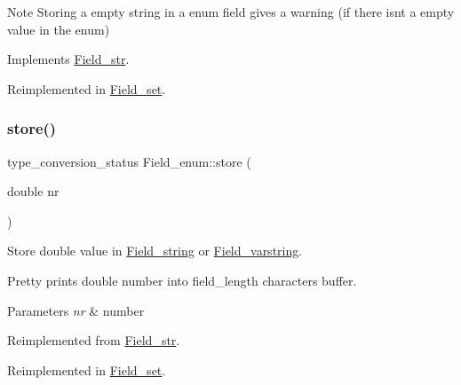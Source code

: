 \begin{DoxyNote}{Note}
Storing a empty string in a enum field gives a warning (if there isn\textquotesingle{}t a empty value in the enum) 
\end{DoxyNote}


Implements \mbox{\hyperlink{classField__str}{Field\+\_\+str}}.



Reimplemented in \mbox{\hyperlink{classField__set_a2c74d155d4d11aac75bba6b93a08cbb3}{Field\+\_\+set}}.

\mbox{\label{classField__enum_a82c1cdf5b47cd0266d9974e834695523}} 
\subsubsection{\texorpdfstring{store()}{store()}\hspace{0.1cm}{\footnotesize\ttfamily [2/2]}}
{\footnotesize\ttfamily type\+\_\+conversion\+\_\+status Field\+\_\+enum\+::store (\begin{DoxyParamCaption}\item[{double}]{nr }\end{DoxyParamCaption})\hspace{0.3cm}{\ttfamily [virtual]}}

Store double value in \mbox{\hyperlink{classField__string}{Field\+\_\+string}} or \mbox{\hyperlink{classField__varstring}{Field\+\_\+varstring}}.

Pretty prints double number into field\+\_\+length characters buffer.


\begin{DoxyParams}{Parameters}
{\em nr} & number \\
\hline
\end{DoxyParams}


Reimplemented from \mbox{\hyperlink{classField__str_ad4b48698ff57cae15a2df92f1145b102}{Field\+\_\+str}}.



Reimplemented in \mbox{\hyperlink{classField__set_a58b1852786b3bfe85a3cd2dd7edbfaf2}{Field\+\_\+set}}.

\mbox{\label{classField__enum_a94bb8c13a4729eb7be3acf8d3c59904c}} 

